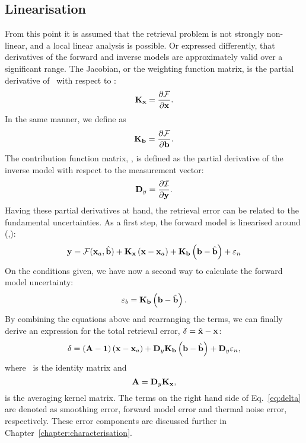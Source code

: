 \subsection{Linearisation}
%
From this point it is assumed that the retrieval problem is not strongly
non-linear, and a local linear analysis is possible. Or expressed differently,
that derivatives of the forward and inverse models are approximately valid over
a significant range. The Jacobian, or the weighting function matrix, is the
partial derivative of \FrwMdl\ with respect to \SttVct:
\begin{equation}
  \label{eq:kx}
  \mathbf{K}_{\mathbf{x}} = \frac{\partial\mathcal{F}}{\partial\mathbf{x}}.
\end{equation}
In the same manner, we define \aWfnMtr{\FrwMdlVct} as
\begin{equation}
  \label{eq:kb}
  \mathbf{K}_{\mathbf{b}} = \frac{\partial\mathcal{F}}{\partial\mathbf{b}}.
\end{equation}
The contribution function matrix, \CtrFncMtr, is defined as the partial
derivative of the inverse model with respect to the measurement vector:
\begin{equation}
  \label{eq:dy}
  \mathbf{D}_{y} = \frac{\partial\mathcal{I}}{\partial\mathbf{y}}.
\end{equation}
Having these partial derivatives at hand, the retrieval error can be related
to the fundamental uncertainties. As a first step, the forward model is
linearised around (,\FrwMdlVctHat):
\begin{equation}
  \label{eq:fmodel3}
  \mathbf{y} = \mathcal{F}(\mathbf{x}_{a},\hat{\mathbf{b}}) + 
  \mathbf{K}_{\mathbf{x}}\left(\mathbf{x}-\mathbf{x}_{a}\right) +
  \mathbf{K}_{\mathbf{b}}\left(\mathbf{b}-\hat{\mathbf{b}}\right) +
  \varepsilon_n
\end{equation}
On the conditions given, we have now a second way to calculate the forward
model uncertainty:
\begin{equation}
  \varepsilon_b = \mathbf{K}_{\mathbf{b}}\left(\mathbf{b}-\hat{\mathbf{b}}\right).
\end{equation}
By combining the equations above and rearranging the terms, we can finally
derive an expression for the total retrieval error, $\delta = \hat{\mathbf{x}} - \mathbf{x}$:
\begin{equation}
  \label{eq:delta}
  \delta =  \left(\mathbf{A}-\mathbf{1}\right)
    \left(\mathbf{x}-\mathbf{x}_{a}\right) + 
    \mathbf{D}_{y}\mathbf{K}_{\mathbf{b}}\left(\mathbf{b}-\hat{\mathbf{b}}\right) +
    \mathbf{D}_{y}\varepsilon_n,
\end{equation}
where \IdnMtr\ is the identity matrix and
\begin{equation}
  \label{eq:A}
  \mathbf{A} = \mathbf{D}_{y}\mathbf{K}_{\mathbf{x}},
\end{equation}
is the averaging kernel matrix. The terms on the right hand side of
Eq.~\ref{eq:delta} are denoted as smoothing error, forward model error and
thermal noise error, respectively. These error components are discussed further
in Chapter~\ref{chapter:characterisation}.


